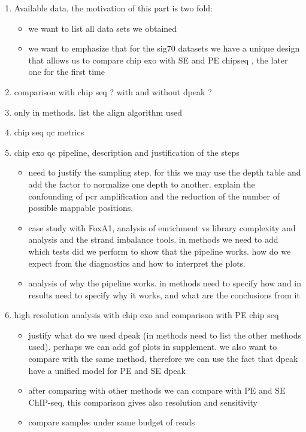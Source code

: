 \documentclass{bmcart}\usepackage[]{graphicx}\usepackage[]{color}
\begin{document}
\begin{enumerate}
\item Available data, the motivation of this part is two fold:
  \begin{itemize}
  \item we want to list all data sets we obtained
  \item we want to emphasize that for the sig70 datasets we have a
    unique design that allows us to compare chip exo with SE and PE
    chipseq , the later one for the first time
  \end{itemize}
\item comparison with chip seq ? with and without dpeak ?
\item only in methods. list the align algorithm used
\item chip seq qc metrics
\item chip exo qc pipeline, description and justification of the steps
\begin{itemize}
\item need to justify the sampling step. for this we may use the depth
  table and add the factor to normalize one depth to another. explain
  the confounding of pcr amplification and the reduction of the number
  of possible mappable positions.
\item case study with FoxA1, analysis of enrichment vs library
  complexity and analysis and the strand imbalance tools. in methods
  we need to add which tests did we perform to show that the pipeline
  works. how do we expect from the diagnostics and how to interpret
  the plots.
\item analysis of why the pipeline works. in methods need to specify
  how and in results need to specify why it works, and what are the
  conclusions from it
\end{itemize}
\item high resolution analysis with chip exo and comparison with PE
  chip seq
  \begin{itemize}
  \item justify what do we used dpeak (in methods need to list the
    other methods used). perhaps we can add gof plots in
    supplement. we also want to compare with the same method,
    therefore we can use the fact that dpeak have a unified model for
    PE and SE dpeak
  \item after comparing with other methods we can compare with PE and
    SE ChIP-seq, this comparison gives also resolution and sensitivity
  \item compare samples under same budget of reads
  \end{itemize} 
\end{enumerate}
\end{document}
